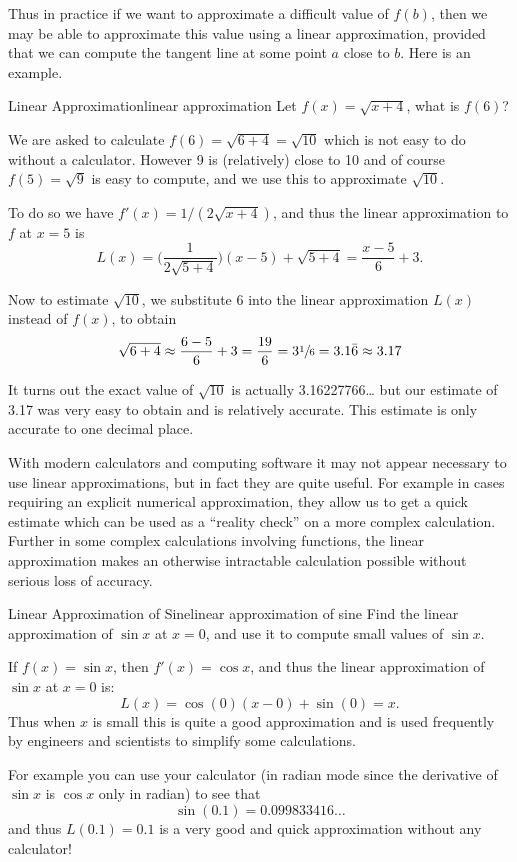 Thus in practice if we want to approximate a difficult value of $f(b)$,
then we may be able to approximate this value using a linear approximation,
provided that we can compute the tangent line at some point $a$ close to $b$.
Here is an example.

\begin{example}{Linear Approximation}{linear approximation}
Let $f(x)=\sqrt{x+4}$, what is $f(6)$?
\end{example}

\begin{solution}
We are asked to calculate $f(6)=\sqrt{6+4}=\sqrt{10}$ which is not easy
to do without a calculator. However 9 is (relatively) close to 10 and
of course $f(5)=\sqrt{9}$ is easy to compute, and we use this to approximate $\sqrt{10}$.

To do so we have $f'(x)=1/(2\sqrt{x+4})$, and thus the linear approximation to $f$ at $x=5$ is
\[L(x)=\bigg(\frac{1}{2\sqrt{5+4}}\bigg)(x-5)+\sqrt{5+4}=\frac{x-5}{6}+3.\]

Now to estimate $\sqrt{10}$, we substitute 6 into the linear approximation $L(x)$ instead of $f(x)$, to obtain
\[ \sqrt{6+4}\approx \frac{6-5}{6}+3=\frac{19}{6}=3\sfrac{1}{6}=3.1\bar{6}\approx 3.17 \]

It turns out the exact value of $\sqrt{10}$ is actually 3.16227766\ldots
but our estimate of 3.17 was very easy to obtain and is relatively accurate.
This estimate is only accurate to one decimal place.
\end{solution}
 
With modern calculators and computing software it may not appear
necessary to use linear approximations, but in fact they are quite
useful. For example in cases requiring an explicit numerical approximation, they
allow us to get a quick estimate which can be used as a
``reality check'' on a more complex calculation. Further in some complex
calculations involving functions, the linear approximation makes an
otherwise intractable calculation possible without serious loss of
accuracy.

\begin{example}{Linear Approximation of Sine}{linear approximation of sine}
Find the linear approximation of $\sin x$ at $x=0$, and use it to compute small values of $\sin x$.
\end{example}

\begin{solution}
If $f(x)=\sin x$, then $f'(x)=\cos x$, and thus the linear approximation of $\sin x$ at $x=0$ is:
\[ L(x)=\cos (0)(x-0)+\sin (0)=x. \]
Thus when $x$ is small this is quite a good approximation and is used
frequently by engineers and scientists to simplify some calculations.

For example you can use your calculator (in radian mode since the
derivative of $\sin x$ is $\cos x$ only in radian) to see that
\[ \sin (0.1)=0.099833416\ldots \]
and thus $L(0.1)=0.1$ is a very good and quick approximation without any calculator!
\end{solution}


